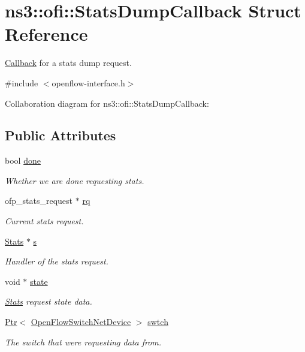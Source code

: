 \hypertarget{structns3_1_1ofi_1_1StatsDumpCallback}{}\section{ns3\+:\+:ofi\+:\+:Stats\+Dump\+Callback Struct Reference}
\label{structns3_1_1ofi_1_1StatsDumpCallback}


\hyperlink{classns3_1_1Callback}{Callback} for a stats dump request.  




{\ttfamily \#include $<$openflow-\/interface.\+h$>$}



Collaboration diagram for ns3\+:\+:ofi\+:\+:Stats\+Dump\+Callback\+:
\subsection*{Public Attributes}
\begin{DoxyCompactItemize}
\item 
bool \hyperlink{structns3_1_1ofi_1_1StatsDumpCallback_ae9e3cad591886180bc8872baee7e0436}{done}
\begin{DoxyCompactList}\small\item\em Whether we are done requesting stats. \end{DoxyCompactList}\item 
ofp\+\_\+stats\+\_\+request $\ast$ \hyperlink{structns3_1_1ofi_1_1StatsDumpCallback_a1130611e469321c18fcaf36c1fa9caeb}{rq}
\begin{DoxyCompactList}\small\item\em Current stats request. \end{DoxyCompactList}\item 
\hyperlink{classns3_1_1ofi_1_1Stats}{Stats} $\ast$ \hyperlink{structns3_1_1ofi_1_1StatsDumpCallback_a54278de7a5108a7488a20ff48a6b6f29}{s}
\begin{DoxyCompactList}\small\item\em Handler of the stats request. \end{DoxyCompactList}\item 
void $\ast$ \hyperlink{structns3_1_1ofi_1_1StatsDumpCallback_a9bfa71df8899d8afa2960e60c9071af6}{state}
\begin{DoxyCompactList}\small\item\em \hyperlink{classns3_1_1ofi_1_1Stats}{Stats} request state data. \end{DoxyCompactList}\item 
\hyperlink{classns3_1_1Ptr}{Ptr}$<$ \hyperlink{classns3_1_1OpenFlowSwitchNetDevice}{Open\+Flow\+Switch\+Net\+Device} $>$ \hyperlink{structns3_1_1ofi_1_1StatsDumpCallback_ad099136b844652e219e992794b14a512}{swtch}
\begin{DoxyCompactList}\small\item\em The switch that we\textquotesingle{}re requesting data from. \end{DoxyCompactList}\end{DoxyCompactItemize}


